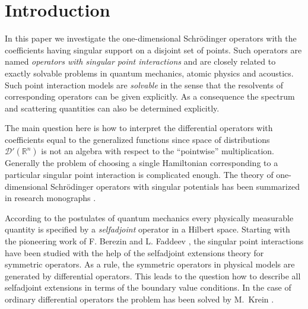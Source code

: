 \documentclass[11pt,english]{amsart}%
\begin{document}




\maketitle


\section*{Introduction}

In this paper we investigate the one-dimensional Schr\"{o}dinger operators with the coefficients having singular support on a disjoint set of points. Such ope\-rators are named \textit{operators with singular point interactions} and are closely related to exactly solvable problems in quantum mechanics, atomic physics and acoustics.
Such point interaction models are \textit{solvable} in the sense that the resolvents of corresponding operators can be given explicitly. As a consequence the spectrum and scattering quantities can also be determined explicitly.

The main question here is how to interpret the differential operators with coefficients equal to the generalized functions since  space of distributions  $\mathcal{D}'(\mathbb{R}^n)$ is not
an algebra with respect to the ``pointwise'' multiplication. Generally the problem of choosing a single Hamiltonian corresponding to a particular singular point interaction is complicated enough.
The theory of one-dimensional Schr\"{o}dinger operators with singular potentials has been summarized in research monographs \cite{Albeverio2edition, AlbeverioKurasov}.

According to the postulates of quantum mechanics every physically measurable quantity is specified by a \textit{selfadjoint} operator in a Hilbert space. Starting with  the pioneering work of F. Berezin and L. Faddeev \cite{BerezinFadeev}, the singular point interactions
 have been studied with the help of the selfadjoint extensions theory for symmetric
operators.
As a rule, the symmetric operators in physical models are generated by differential operators.
This leads to the question how to describe all selfadjoint extensions in terms of the boundary value conditions.
In the case of ordinary differential operators the problem has been solved by M.~Krein \cite{AkhiezerGlazman, Krein}.
\end{document}
